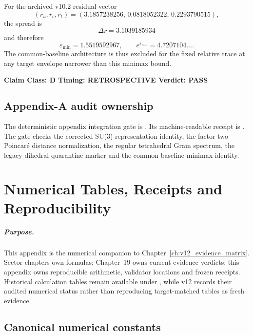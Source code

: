 \documentclass[11pt,a4paper,twoside]{book}
\def\({}%
\def\){}%
\theoremstyle{definition}
\newcommand{\vTwelveStatus}[3]{\par\noindent\textbf{Claim Class: #1 \quad Timing: #2 \quad Verdict: #3}\par}
\begin{document}
For the archived v10.2 residual vector
\[
(r_u,r_c,r_t)
=(3.1857238256,\,0.0818052322,\,0.2293790515),
\]
the spread is
\[
\Delta r=3.1039185934
\]
and therefore
\[
\varepsilon_{\min}=1.5519592967,
\qquad
e^{\varepsilon_{\min}}=4.7207104\ldots .
\]
The common-baseline architecture is thus excluded for the fixed relative trace
at any target envelope narrower than this minimax bound.
\vTwelveStatus{D}{RETROSPECTIVE}{PASS}

\section{Appendix-A audit ownership}

The deterministic appendix integration gate is
.
Its machine-readable receipt is
.
The gate checks the corrected \(SU(3)\) representation identity, the factor-two
Poincar\'e distance normalization, the regular tetrahedral Gram spectrum, the
legacy dihedral quarantine marker and the common-baseline minimax identity.

\clearpage

\chapter{Numerical Tables, Receipts and Reproducibility}
\label{app:v12_numerics_reproducibility}

\paragraph{Purpose.}
This appendix is the numerical companion to Chapter~\ref{ch:v12_evidence_matrix}.
Sector chapters own formulas; Chapter~19 owns current evidence verdicts; this
appendix owns reproducible arithmetic, validator locations and frozen receipts.
Historical calculation tables remain available under
, while v12 records their audited numerical
status rather than reproducing target-matched tables as fresh evidence.

\section{Canonical numerical constants}
\end{document}

